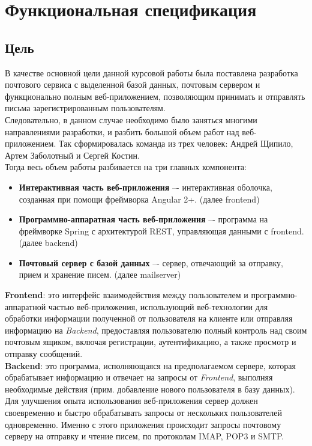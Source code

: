 \documentclass{article}
\begin{document}
\newpage
\tableofcontents
\newpage

\section{Функциональная спецификация}
\subsection{Цель}
В качестве основной цели данной курсовой работы была поставлена разработка почтового сервиса с выделенной базой данных, почтовым сервером и функционально полным веб-приложением, позволяющим принимать и отправлять письма зарегистрированным пользователям. \\

Следовательно, в данном случае необходимо было заняться многими направлениями разработки, и разбить большой объем работ над веб-приложением. Так сформировалась команда из трех человек: Андрей Щипило, Артем Заболотный и Сергей Костин. \\

Тогда весь объем работы разбивается на три главных компонента: 
\begin{itemize}
	\item \textbf{Интерактивная часть веб-приложения} –- интерактивная оболочка, созданная при помощи фреймворка Angular 2+. (далее frontend)

	\item \textbf{Программно-аппаратная часть веб-приложения} –- программа на фреймворке Spring с архитектурой REST, управляющая данными с frontend. (далее backend)

	\item \textbf{Почтовый сервер с базой данных} –- сервер, отвечающий за отправку, прием и хранение писем. (далее mailserver)
\end{itemize}


\textbf{Frontend}: это интерфейс взаимодействия между пользователем и программно-аппаратной частью веб-приложения, использующий веб-технологии для обработки информации полученной от пользователя на клиенте или отправляя информацию на \emph{Backend}, предоставляя пользователю полный контроль над своим почтовым ящиком, включая регистрации, аутентификацию, а также просмотр и отправку сообщений. \\

\textbf{Backend}: это программа, исполняющаяся на предполагаемом сервере, которая обрабатывает информацию и отвечает на запросы от \emph{Frontend}, выполняя необходимые действия (прим. добавление нового пользователя в базу данных). Для улучшения опыта использования веб-приложения сервер должен своевременно и быстро обрабатывать запросы от нескольких пользователей одновременно. Именно с этого приложения происходит запросы почтовому серверу на отправку и чтение писем, по протоколам IMAP, POP3 и SMTP. \\
\end{document}
